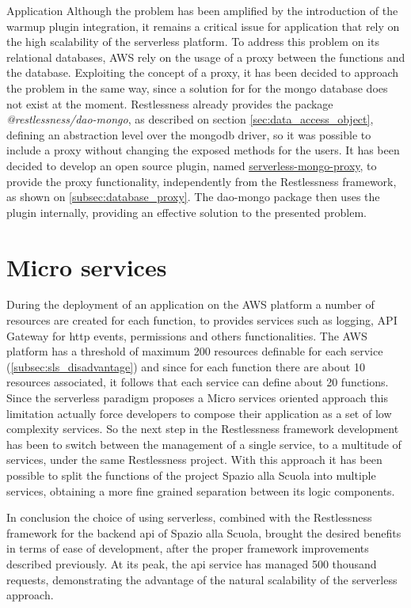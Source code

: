 \begin{chapter}{Application}
    Although the problem has been amplified by the introduction of the warmup plugin
    integration, it remains a critical issue for application that rely on the high
    scalability of the serverless platform.
    To address this problem on its relational databases, AWS rely on the usage of a
    proxy between the functions and the database. Exploiting the concept of a proxy,
    it has been decided to approach the problem in the same way, since a solution for
    for the mongo database does not exist at the moment.
    Restlessness already provides the package \textit{@restlessness/dao-mongo}, as
    described on section \ref{sec:data_access_object}, defining an abstraction level
    over the mongodb driver, so it was possible to include a proxy without changing
    the exposed methods for the users.
    It has been decided to develop an open source plugin, named
    \href{https://github.com/getapper/serverless-mongo-proxy}{serverless-mongo-proxy},
    to provide the proxy functionality, independently from the Restlessness framework,
    as shown on \ref{subsec:database_proxy}.
    The dao-mongo package then uses the plugin internally, providing an effective
    solution to the presented problem.

    \section{Micro services}
    \label{subsec:application_micro_services}
    During the deployment of an application on the AWS platform a number of resources
    are created for each function, to provides services such as logging, API Gateway
    for http events, permissions and others functionalities. The AWS platform has a
    threshold of maximum 200 resources definable for each service
    (\ref{subsec:sls_disadvantage}) and since for each function there are about 10
    resources associated, it follows that each service can define about 20 functions.
    Since the serverless paradigm proposes a Micro services oriented approach this
    limitation actually force developers to compose their application as a set of
    low complexity services.
    So the next step in the Restlessness framework development has been to switch
    between the management of a single service, to a multitude of services, under
    the same Restlessness project. With this approach it has been possible to split
    the functions of the project Spazio alla Scuola into multiple services, obtaining
    a more fine grained separation between its logic components.

    \bigbreak
    In conclusion the choice of using serverless, combined with the Restlessness
    framework for the backend api of Spazio alla Scuola, brought the desired benefits
    in terms of ease of development, after the proper framework improvements described
    previously. At its peak, the api service has managed 500 thousand requests,
    demonstrating the advantage of the natural scalability of the serverless approach.

\end{chapter}
